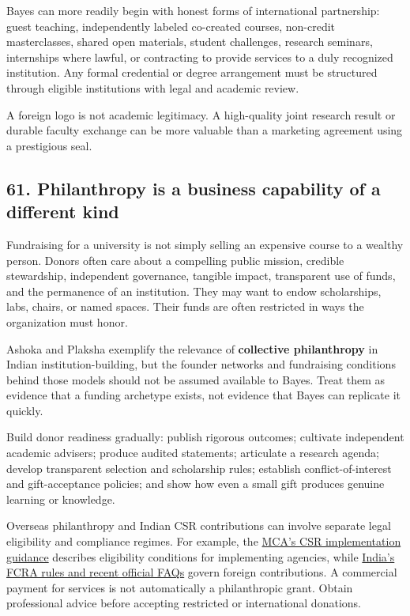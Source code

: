 Bayes can more readily begin with honest forms of international partnership: guest teaching, independently labeled co-created courses, non-credit masterclasses, shared open materials, student challenges, research seminars, internships where lawful, or contracting to provide services to a duly recognized institution. Any formal credential or degree arrangement must be structured through eligible institutions with legal and academic review.

A foreign logo is not academic legitimacy. A high-quality joint research result or durable faculty exchange can be more valuable than a marketing agreement using a prestigious seal.

\subsection{61. Philanthropy is a business capability of a different kind}

Fundraising for a university is not simply selling an expensive course to a wealthy person. Donors often care about a compelling public mission, credible stewardship, independent governance, tangible impact, transparent use of funds, and the permanence of an institution. They may want to endow scholarships, labs, chairs, or named spaces. Their funds are often restricted in ways the organization must honor.

Ashoka and Plaksha exemplify the relevance of \textbf{collective philanthropy} in Indian institution-building, but the founder networks and fundraising conditions behind those models should not be assumed available to Bayes. Treat them as evidence that a funding archetype exists, not evidence that Bayes can replicate it quickly.

Build donor readiness gradually: publish rigorous outcomes; cultivate independent academic advisers; produce audited statements; articulate a research agenda; develop transparent selection and scholarship rules; establish conflict-of-interest and gift-acceptance policies; and show how even a small gift produces genuine learning or knowledge.

Overseas philanthropy and Indian CSR contributions can involve separate legal eligibility and compliance regimes. For example, the \href{https://www.csrxchange.gov.in/\allowbreak Frontend/faq}{MCA's CSR implementation guidance} describes eligibility conditions for implementing agencies, while \href{https://www.pib.gov.in/\allowbreak FaqDetails.aspx?ModuleId=4\&NoteId=159301\&id=159301\&lang=1\&reg=48}{India's FCRA rules and recent official FAQs} govern foreign contributions. A commercial payment for services is not automatically a philanthropic grant. Obtain professional advice before accepting restricted or international donations.

